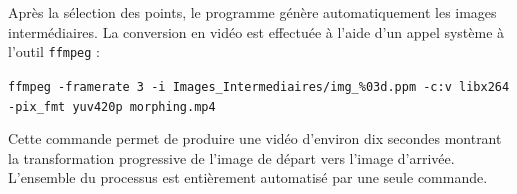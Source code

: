 \documentclass[11pt,a4paper]{article}
\begin{document}
	Après la sélection des points, le programme génère automatiquement les images intermédiaires.  
	La conversion en vidéo est effectuée à l’aide d’un appel système à l’outil \texttt{ffmpeg} :
	\begin{center}
		\texttt{ffmpeg -framerate 3 -i Images\_Intermediaires/img\_\%03d.ppm -c:v libx264 -pix\_fmt yuv420p morphing.mp4}
	\end{center}
	
	Cette commande permet de produire une vidéo d’environ dix secondes montrant la transformation progressive de l’image de départ vers l’image d’arrivée. L’ensemble du processus est entièrement automatisé par une seule commande.
	
\end{document}
